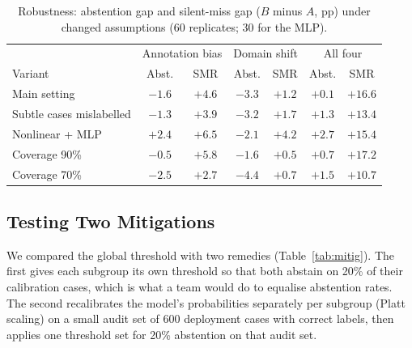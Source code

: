 \begin{table}[t]
\centering
\caption{Robustness: abstention gap and silent-miss gap ($B$ minus $A$, pp) under changed assumptions (60 replicates; 30 for the MLP).}
\label{tab:robust}
\footnotesize
\setlength{\tabcolsep}{3pt}
\begin{tabular}{@{}lcccccc@{}}
\toprule
 & \multicolumn{2}{c}{Annotation bias} & \multicolumn{2}{c}{Domain shift} & \multicolumn{2}{c}{All four} \\
Variant & Abst. & SMR & Abst. & SMR & Abst. & SMR \\
\midrule
Main setting & $-1.6$ & $+4.6$ & $-3.3$ & $+1.2$ & $+0.1$ & $+16.6$ \\
Subtle cases mislabelled & $-1.3$ & $+3.9$ & $-3.2$ & $+1.7$ & $+1.3$ & $+13.4$ \\
Nonlinear + MLP & $+2.4$ & $+6.5$ & $-2.1$ & $+4.2$ & $+2.7$ & $+15.4$ \\
Coverage 90\% & $-0.5$ & $+5.8$ & $-1.6$ & $+0.5$ & $+0.7$ & $+17.2$ \\
Coverage 70\% & $-2.5$ & $+2.7$ & $-4.4$ & $+0.7$ & $+1.5$ & $+10.7$ \\
\bottomrule
\end{tabular}
\end{table}

\subsection{Testing Two Mitigations}
We compared the global threshold with two remedies (Table~\ref{tab:mitig}). The first gives each subgroup its own threshold so that both abstain on 20\% of their calibration cases, which is what a team would do to equalise abstention rates. The second recalibrates the model's probabilities separately per subgroup (Platt scaling) on a small audit set of 600 deployment cases with correct labels, then applies one threshold set for 20\% abstention on that audit set.


